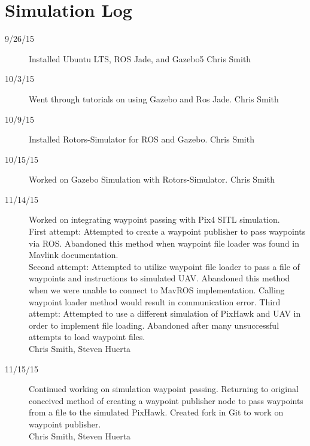\section{Simulation Log}

\begin{description}
\item [9/26/15]  Installed Ubuntu LTS, ROS Jade, and Gazebo5 \hfill{Chris Smith}
\item [10/3/15] Went through tutorials on using Gazebo and Ros Jade. \hfill{Chris Smith}
\item [10/9/15] Installed Rotors-Simulator for ROS and Gazebo. \hfill{Chris Smith}
\item [10/15/15] Worked on Gazebo Simulation with Rotors-Simulator. \hfill{Chris Smith}
\item [11/14/15] Worked on integrating waypoint passing with Pix4 SITL simulation.\\
First attempt: Attempted to create a waypoint publisher to pass waypoints via ROS. Abandoned this method when waypoint file loader was found in Mavlink documentation.\\
Second attempt: Attempted to utilize waypoint file loader to pass a file of waypoints and instructions to simulated UAV. Abandoned this method when we were unable to connect to MavROS implementation. Calling waypoint loader method would result in communication error.
Third attempt: Attempted to use a different simulation of PixHawk and UAV in order to implement file loading. Abandoned after many unsuccessful attempts to load waypoint files.\\

\hfill{Chris Smith, Steven Huerta}

\item [11/15/15] Continued working on simulation waypoint passing. Returning to original conceived method of creating a waypoint publisher node to pass waypoints from a file to the simulated PixHawk. Created fork in Git to work on waypoint publisher.\\

\hfill{Chris Smith, Steven Huerta}
\end{description}